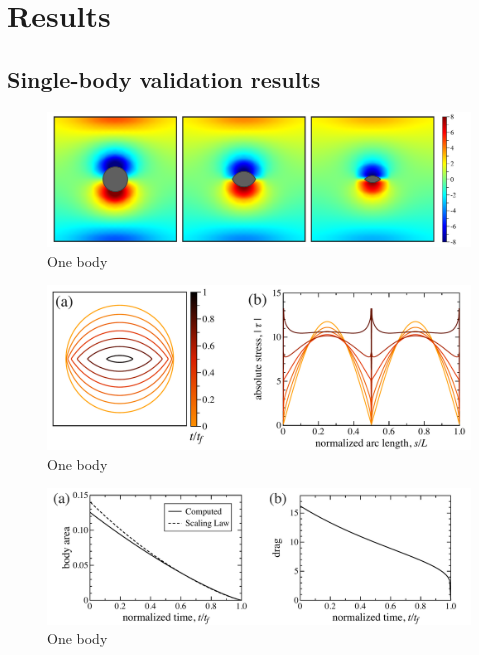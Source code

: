 \documentclass[preprint, 10pt]{elsarticle}
\begin{document}
\section{Results\label{s:results}} 

\subsection{Single-body validation results}

\begin{figure}%
\begin{center}
\includegraphics[width = 0.9 \textwidth]{./figs/01bodseq.pdf}
\caption{One body}
\label{}
\end{center}
\end{figure}

\begin{figure}%
\begin{center}
\includegraphics[width = 0.8 \textwidth]{./figs/shrink_intface.pdf}
\caption{One body}
\label{}
\end{center}
\end{figure}

\begin{figure}%
\begin{center}
\includegraphics[width = 0.8 \textwidth]{./figs/area_drag.pdf}
\caption{One body}
\label{}
\end{center}
\end{figure}
\end{document}
